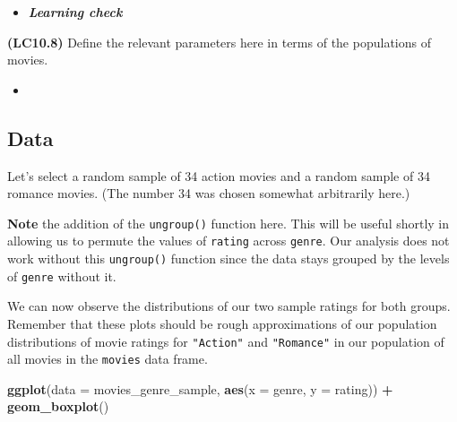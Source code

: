 \documentclass[12pt, krantz2,]{krantz}
\makeatletter
\newenvironment{Shaded}{\begin{snugshade}}{\end{snugshade}}
\newcommand{\DataTypeTok}[1]{\textcolor[rgb]{0.27,0.27,0.27}{#1}}
\newcommand{\DecValTok}[1]{\textcolor[rgb]{0.06,0.06,0.06}{#1}}
\newcommand{\KeywordTok}[1]{\textcolor[rgb]{0.27,0.27,0.27}{\textbf{#1}}}
\newcommand{\NormalTok}[1]{#1}
\newcommand{\OperatorTok}[1]{\textcolor[rgb]{0.43,0.43,0.43}{\textbf{#1}}}
\newcommand{\StringTok}[1]{\textcolor[rgb]{0.5,0.5,0.5}{#1}}
\newenvironment{kframe}{%
\medskip{}
\setlength{\fboxsep}{.8em}
 \def\at@end@of@kframe{}%
 \ifinner\ifhmode%
  \def\at@end@of@kframe{\end{minipage}}%
  \begin{minipage}{\columnwidth}%
 \fi\fi%
 \def\FrameCommand##1{\hskip\@totalleftmargin \hskip-\fboxsep
 \colorbox{shadecolor}{##1}\hskip-\fboxsep
     \hskip-\linewidth \hskip-\@totalleftmargin \hskip\columnwidth}%
 \MakeFramed {\advance\hsize-\width
   \@totalleftmargin\z@ \linewidth\hsize
   \@setminipage}}%
 {\par\unskip\endMakeFramed%
 \at@end@of@kframe}
\renewenvironment{Shaded}{\begin{kframe}}{\end{kframe}}
\newenvironment{rmdblock}[1]
  {\begin{shaded*}
  \begin{itemize}
  \renewcommand{\labelitemi}{
    \raisebox{-.7\height}[0pt][0pt]{
    }
  }
  \item
  }
  {
  \end{itemize}
  \end{shaded*}
  }
\newenvironment{learncheck}
  {\begin{rmdblock}{warning}}
  {\end{rmdblock}}
\makeatother
\begin{document}
\begin{learncheck}
\textbf{\emph{Learning check}}
\end{learncheck}

\textbf{(LC10.8)} Define the relevant parameters here in terms of the populations of movies.

\begin{learncheck}

\end{learncheck}

\hypertarget{data}{%
\subsection{Data}\label{data}}

Let's select a random sample of 34 action movies and a random sample of 34 romance movies. (The number 34 was chosen somewhat arbitrarily here.)

\begin{Shaded}
\end{Shaded}

\textbf{Note} the addition of the \texttt{ungroup()} function here. This will be useful shortly in allowing us to permute the values of \texttt{rating} across \texttt{genre}. Our analysis does not work without this \texttt{ungroup()} function since the data stays grouped by the levels of \texttt{genre} without it.

We can now observe the distributions of our two sample ratings for both groups. Remember that these plots
should be rough approximations of our population distributions of movie ratings for \texttt{"Action"} and \texttt{"Romance"}
in our population of all movies in the \texttt{movies} data frame.

\begin{Shaded}
\begin{Highlighting}[]
\KeywordTok{ggplot}\NormalTok{(}\DataTypeTok{data =}\NormalTok{ movies_genre_sample, }\KeywordTok{aes}\NormalTok{(}\DataTypeTok{x =}\NormalTok{ genre, }\DataTypeTok{y =}\NormalTok{ rating)) }\OperatorTok{+}
\StringTok{  }\KeywordTok{geom_boxplot}\NormalTok{()}
\end{Highlighting}
\end{Shaded}
\end{document}

